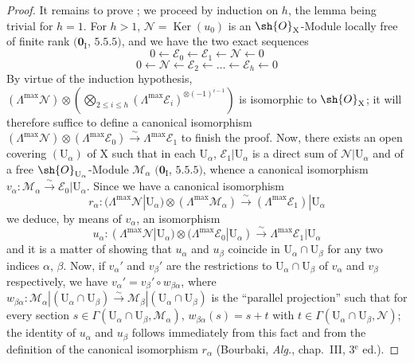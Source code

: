 \begin{proof}
It remains to prove ; we proceed by induction on $h$, the lemma being trivial for $h=1$.
For $h>1$, $\mathscr{N}=\operatorname{Ker}(u_0)$ is an $\sh{O}_{\mathrm{X}}$-Module locally free of finite rank $(\mathbf{0}_{\mathrm{I}}$, $5.5.5)$, and we have the two exact sequences
\[
  0\leftarrow\mathscr{E}_0\leftarrow\mathscr{E}_1\leftarrow\mathscr{N}\leftarrow 0
\]
\[
  0\leftarrow\mathscr{N}\leftarrow\mathscr{E}_2\leftarrow\ldots\leftarrow\mathscr{E}_h\leftarrow 0
\]
By virtue of the induction hypothesis, $(\Lambda^{\max}\mathscr{N})\otimes(\bigotimes_{2\leq i\leq h}(\Lambda^{\max}\mathscr{E}_i)^{\otimes(-1)^{i-1}})$ is isomorphic to $\sh{O}_{\mathrm{X}}$; it will therefore suffice to define a canonical isomorphism $(\Lambda^{\max}\mathscr{N})\otimes(\Lambda^{\max}\mathscr{E}_0)\xrightarrow{\sim}\Lambda^{\max}\mathscr{E}_1$ to finish the proof.
Now, there exists an open covering $(\mathrm{U}_\alpha)$ of $\mathrm{X}$ such that in each $\mathrm{U}_\alpha$, $\mathscr{E}_1|\mathrm{U}_\alpha$ is a direct sum of $\mathscr{N}|\mathrm{U}_\alpha$ and of a free $\sh{O}_{\mathrm{U}_\alpha}$-Module $\mathscr{M}_\alpha$ $(\mathbf{0}_{\mathrm{I}}$, $5.5.5)$, whence a canonical isomorphism $v_\alpha:\mathscr{M}_\alpha\xrightarrow{\sim}\mathscr{E}_0|\mathrm{U}_\alpha$.
Since we have a canonical isomorphism
\[
  r_\alpha:(\Lambda^{\max}\mathscr{N}|\mathrm{U}_\alpha)\otimes(\Lambda^{\max}\mathscr{M}_\alpha)\xrightarrow{\sim}(\Lambda^{\max}\mathscr{E}_1)|\mathrm{U}_\alpha
\]
we deduce, by means of $v_\alpha$, an isomorphism
\[
  u_\alpha:(\Lambda^{\max}\mathscr{N}|\mathrm{U}_\alpha)\otimes(\Lambda^{\max}\mathscr{E}_0|\mathrm{U}_\alpha)\xrightarrow{\sim}\Lambda^{\max}\mathscr{E}_1|\mathrm{U}_\alpha
\]
and it is a matter of showing that $u_\alpha$ and $u_\beta$ coincide in $\mathrm{U}_\alpha\cap\mathrm{U}_\beta$ for any two indices $\alpha$, $\beta$.
Now, if $v_\alpha'$ and $v_\beta'$ are the restrictions to $\mathrm{U}_\alpha\cap\mathrm{U}_\beta$ of $v_\alpha$ and $v_\beta$ respectively, we have $v_\alpha'=v_\beta'\circ w_{\beta\alpha}$, where $w_{\beta\alpha}:\mathscr{M}_\alpha|(\mathrm{U}_\alpha\cap\mathrm{U}_\beta)\xrightarrow{\sim}\mathscr{M}_\beta|(\mathrm{U}_\alpha\cap\mathrm{U}_\beta)$ is the ``parallel projection'' such that for every section $s\in\Gamma(\mathrm{U}_\alpha\cap\mathrm{U}_\beta,\mathscr{M}_\alpha)$, $w_{\beta\alpha}(s)=s+t$ with $t\in\Gamma(\mathrm{U}_\alpha\cap\mathrm{U}_\beta,\mathscr{N})$; the identity of $u_\alpha$ and $u_\beta$ follows immediately from this fact and from the definition of the canonical isomorphism $r_\alpha$ (Bourbaki, \emph{Alg.}, chap.~III, 3$^{\text{e}}$ ed.).
\end{proof}

